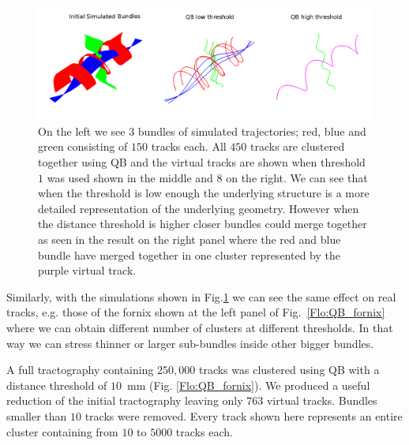 \documentclass[preprint,authoryear,a4paper,10pt,onecolumn]{elsarticle}
\begin{document}
\begin{figure}
\begin{centering}
\includegraphics[scale=0.7]{last_figures/helix_phantom}
\par\end{centering}
\caption{On the left we see $3$ bundles of simulated trajectories; red,
  blue and green consisting of $150$ tracks each. All $450$ tracks are
  clustered together using QB and the virtual tracks are shown when
  threshold $1$ was used shown in the middle and $8$ on the right.  We
  can see that when the threshold is low enough the underlying structure
  is a more detailed representation of the underlying geometry. However
  when the distance threshold is higher closer bundles could merge
  together as seen in the result on the right panel where the red and
  blue bundle have merged together in one cluster represented by the
  purple virtual track.\label{Flo:simulated_orbits}}
\end{figure}

Similarly, with the simulations shown in Fig.\ref{Flo:simulated_orbits}
we can see the same effect on real tracks, e.g. those of the fornix
shown at the left panel of Fig.~\ref{Flo:QB_fornix} where we can obtain
different number of clusters at different thresholds. In that way we can
stress thinner or larger sub-bundles inside other bigger bundles. 

A full tractography containing $250,000$ tracks was clustered using QB
with a distance threshold of $10$~mm (Fig. \ref{Flo:QB_fornix}).  We
produced a useful reduction of the initial tractography leaving only
$763$ virtual tracks. Bundles smaller than $10$ tracks were
removed. Every track shown here represents an entire cluster containing
from $10$ to $5000$ tracks each.
\end{document}
